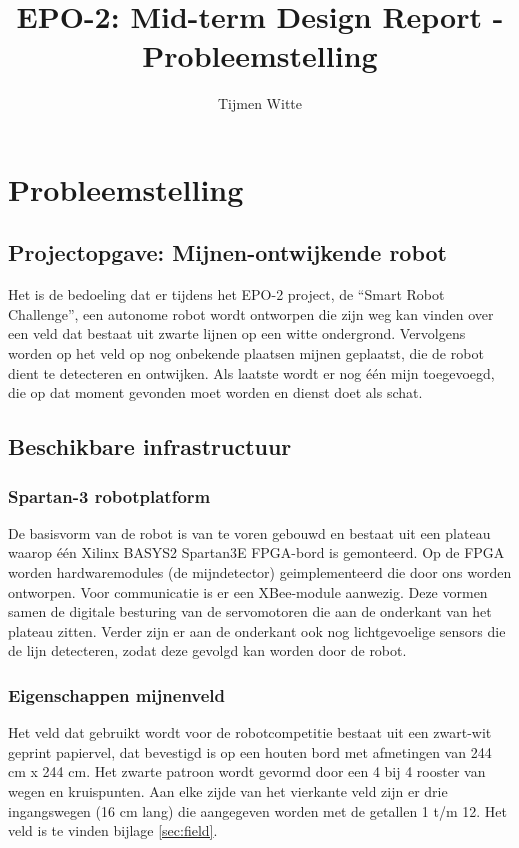 \documentclass{report}
\title{EPO-2: Mid-term Design Report - Probleemstelling}
\author{Tijmen Witte}
\begin{document}
\chapter{Probleemstelling}
\label{ch:probleem}

\section{Projectopgave: Mijnen-ontwijkende robot}

Het is de bedoeling dat er tijdens het EPO-2 project, de ``Smart Robot Challenge'', een autonome robot wordt ontworpen die zijn weg kan vinden over een veld dat bestaat uit zwarte lijnen op een witte ondergrond. Vervolgens worden op het veld op nog onbekende plaatsen mijnen geplaatst, die de robot dient te detecteren en ontwijken. Als laatste wordt er nog één mijn toegevoegd, die op dat moment gevonden moet worden en dienst doet als schat.

\section{Beschikbare infrastructuur}
\subsection{Spartan-3 robotplatform}

De basisvorm van de robot is van te voren gebouwd en bestaat uit een plateau waarop één Xilinx BASYS2 Spartan3E FPGA-bord is gemonteerd. Op de FPGA worden hardwaremodules (de mijndetector) geimplementeerd die door ons worden ontworpen. Voor communicatie is er een XBee-module aanwezig. Deze vormen samen de digitale besturing van de servomotoren die aan de onderkant van het plateau zitten. Verder zijn er aan de onderkant ook nog lichtgevoelige sensors die de lijn detecteren, zodat deze gevolgd kan worden door de robot. 

\subsection{Eigenschappen mijnenveld}

Het veld dat gebruikt wordt voor de robotcompetitie bestaat uit een zwart-wit geprint papiervel, dat bevestigd is op een houten bord met afmetingen van 244 cm x 244 cm. Het zwarte patroon wordt gevormd door een 4 bij 4 rooster van wegen en kruispunten. Aan elke zijde van het vierkante veld zijn er drie ingangswegen (16 cm lang) die aangegeven worden met de getallen 1 t/m 12. Het veld is te vinden bijlage \ref{sec:field}.
\end{document}
